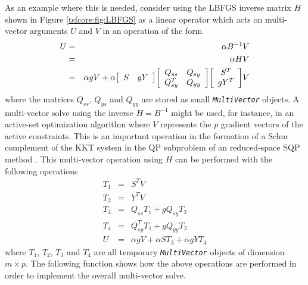 As an example where this is needed, consider using the LBFGS inverse
matrix $H$ shown in Figure {}\ref{tsfcore:fig:LBFGS} as a linear
operator which acts on multi-vector arguments $U$ and $V$ in an
operation of the form
%
\begin{eqnarray*}
U & = & \alpha B^{-1} V \\
  & = & \alpha H V \\
  & = & \alpha g V + \alpha
                            {\bmat{cc} S & g Y \emat}
                            {\bmat{cc} Q_{ss} & Q_{sy} \\ Q_{sy}^T & Q_{yy} \emat}
                            {\bmat{c} S^T \\ g Y^T \emat} V
\end{eqnarray*}
%
where the matrices $Q_{ss}$, $Q_{ys}$ and $Q_{yy}$ are stored as small
{}\texttt{\textit{Multi\-Vector}} objects.  A multi-vector solve using
the inverse $H = B^{-1}$ might be used, for instance, in an active-set
optimization algorithm where $V$ represents the $p$ gradient vectors
of the active constraints.  This is an important operation in the
formation of a Schur complement of the KKT system in the QP subproblem
of an reduced-space SQP method {}\cite{RABartlett_2001}.  This
multi-vector operation using $H$ can be performed with the following
operations
%
\begin{eqnarray*}
T_1 & = & S^T V \\
T_2 & = & Y^T V \\
T_3 & = & Q_{ss} T_1 + g Q_{sy} T_2 \\
T_4 & = & Q_{sy}^T T_1 + g Q_{yy} T_2 \\
U   & = & \alpha g V + \alpha S T_3 + \alpha g Y T_4
\end{eqnarray*}
%
where $T_1$, $T_2$, $T_3$ and $T_4$ are all temporary
{}\texttt{\textit{Multi\-Vector}} objects of dimension $m \times p$.
The following function shows how the above operations are performed in
order to implement the overall multi-vector solve.

